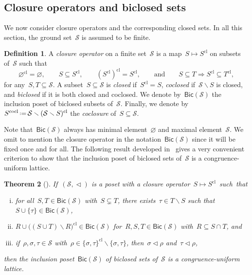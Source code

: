\documentclass{amsart}
\newtheorem{theorem}{Theorem}[part]
\theoremstyle{definition}
\newtheorem{definition}[theorem]{Definition}
\newcommand{\cS}{\mathcal{S}} %
\newcommand{\ssm}{\smallsetminus} %
\newcommand{\eqdef}{\mbox{\,\raisebox{0.2ex}{\scriptsize\ensuremath{\mathrm:}}\ensuremath{=}\,}} %
\newcommand{\darkblue}{\color{darkblue}} %
\newcommand{\defn}[1]{\textsl{\darkblue #1}} %
\newcommand{\closure}[1]{#1^{\mathrm{cl}}} %
\newcommand{\coclosure}[1]{#1^{\mathrm{cocl}}} %
\newcommand{\Bicl}[1]{\mathsf{Bic}(#1)} %
\begin{document}
\subsection{Closure operators and biclosed sets}

We now consider closure operators and the corresponding closed sets. In all this section, the ground set~$\cS$ is assumed to be finite.

\begin{definition}
\label{def:closureOperator}
A \defn{closure operator} on a finite set~$\cS$ is a map~$S \mapsto \closure{S}$ on subsets of~$\cS$ such that
\[
\closure{\varnothing} = \varnothing,
\qquad
S \subseteq \closure{S},
\qquad
\closure{(\closure{S})} = \closure{S},
\qquad\text{and}\qquad
S \subseteq T \Longrightarrow \closure{S} \subseteq \closure{T},
\]
for any~$S,T \subseteq \cS$.
A subset~$S \subseteq \cS$ is \defn{closed} if~$\closure{S} = S$, \defn{coclosed} if~$\cS \ssm S$ is closed, and \defn{biclosed} if it is both closed and coclosed.
We denote by~$\Bicl{\cS}$ the inclusion poset of biclosed subsets of~$\cS$.
Finally, we denote by~$\coclosure{S} \eqdef \cS \ssm \closure{(\cS \ssm S)}$ the \defn{coclosure} of~$S \subseteq \cS$.
\end{definition}

Note that~$\Bicl{\cS}$ always has minimal element~$\varnothing$ and maximal element~$\cS$.
We omit to mention the closure operator in the notation~$\Bicl{\cS}$ since it will be fixed once and for all.
The following result developed in~\cite[Sect.~5]{McConville} gives a very convenient criterion to show that the inclusion poset of biclosed sets of~$\cS$ is a congruence-uniform lattice.

\begin{theorem}[{\cite[Thm.~5.5]{McConville}}]
\label{thm:characterizationCongruenceUniform}
If~$(\cS, \vartriangleleft)$ is a poset with a closure operator~$S \mapsto \closure{S}$~such~that
\begin{enumerate}[(i)]
\item for all~$S,T \in \Bicl{\cS}$ with~$S \subsetneq T$, there exists~$\tau \in T \ssm S$ such that~$S \cup \{\tau\} \in \Bicl{\cS}$, %
\item $R \cup \closure{\big((S \cup T) \ssm R\big)} \in \Bicl{\cS}$ for~$R,S,T \in \Bicl{\cS}$ with~$R \subseteq S \cap T$, and
\item if~$\rho,\sigma,\tau \in \cS$ with~$\rho \in \closure{\{\sigma,\tau\}} \ssm \{\sigma,\tau\}$, then~$\sigma \vartriangleleft \rho$ and~$\tau \vartriangleleft \rho$,
\end{enumerate}
then the inclusion poset~$\Bicl{\cS}$ of biclosed sets of~$\cS$ is a congruence-uniform lattice.
\end{theorem}
\end{document}
